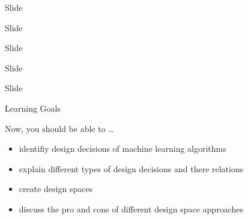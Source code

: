 \begin{frame}[c]{Slide}


\end{frame}
\begin{frame}[c]{Slide}


\end{frame}
\begin{frame}[c]{Slide}


\end{frame}
\begin{frame}[c]{Slide}


\end{frame}
\begin{frame}[c]{Slide}


\end{frame}



\begin{frame}[c]{Learning Goals}

Now, you should be able to \ldots

\begin{itemize}
  \item identifiy design decisions of machine learning algorithms
  \item explain different types of design decisions and there relations
  \item create design spaces
  \item discuss the pro and cons of different design space approaches
\end{itemize}

\end{frame}

